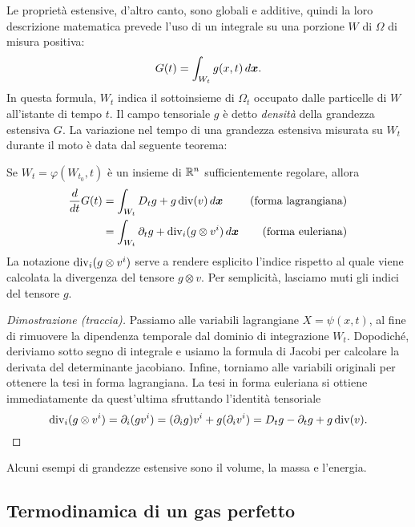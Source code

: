 Le proprietà estensive, d'altro canto, sono globali e additive,
quindi la loro descrizione matematica prevede l'uso di un integrale
su una porzione $W$ di $\Omega$ di misura positiva:
\begin{equation} \label{eq:definizione-estensiva}
G(t) = \int_{W_t} g(x,t) \, d\bm{x}.
\end{equation}
In questa formula, $W_t$ indica il sottoinsieme di $\Omega_t$
occupato dalle particelle di $W$ all'istante di tempo $t$.
Il campo tensoriale $g$ è detto \emph{densità} della grandezza
estensiva $G$.
La variazione nel tempo di una grandezza estensiva misurata
su $W_t$ durante il moto è data dal seguente teorema:

\begin{teor} \label{teor:reynolds}
Se $W_t = \varphi(W_{t_0},t)$ è un insieme di $\mathbb{R}^n$ sufficientemente
regolare, allora
\begin{align*}
\frac{d}{dt} G(t)
&= \int_{W_t} D_t g + g \operatorname{div}(v) \, d\bm{x} & \text{(forma lagrangiana)} \\
&= \int_{W_t} \partial_t g + \operatorname{div}_i(g \otimes v^i) \, d\bm{x} & \text{(forma euleriana)}
\end{align*}
La notazione $\operatorname{div}_i(g \otimes v^i)$ serve a rendere esplicito
l'indice rispetto al quale viene calcolata la divergenza del tensore
$g \otimes v$. Per semplicità, lasciamo muti gli indici del tensore $g$.
\end{teor}

\begin{proof}[Dimostrazione (traccia)]
Passiamo alle variabili lagrangiane $X = \psi(x,t)$, al fine di rimuovere
la dipendenza temporale dal dominio di integrazione $W_t$.
Dopodiché, deriviamo sotto segno di integrale e usiamo la formula di Jacobi
per calcolare la derivata del determinante jacobiano.
Infine, torniamo alle variabili originali per ottenere la tesi
in forma lagrangiana. La tesi in forma euleriana si ottiene
immediatamente da quest'ultima sfruttando l'identità tensoriale
\[
\operatorname{div}_i(g \otimes v^i)
= \partial_i (g v^i)
= (\partial_i g) v^i + g (\partial_i v^i)
= D_t g - \partial_t g + g \operatorname{div}(v). \qedhere
\]
\end{proof}

\noindent Alcuni esempi di grandezze estensive sono il volume, la massa e l'energia.

\subsection*{Termodinamica di un gas perfetto}

